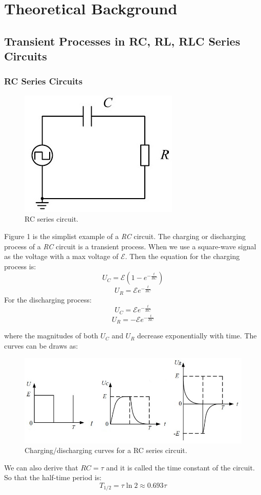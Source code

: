 \documentclass[12pt, a4paper]{article}
\begin{document}
\section{Theoretical Background}
\subsection{Transient Processes in RC, RL, RLC Series Circuits}
\subsubsection{RC Series Circuits}
\begin{figure}[H]
	\centering
	\includegraphics[scale=0.6]{fig1.jpg}
	\caption{RC series circuit.}
\end{figure}
Figure 1 is the simplist example of a \textit{RC} circuit. The charging or discharging process of a \textit{RC} 
circuit is a transient process. When we use a square-wave signal as the voltage with a max voltage of $\mathcal{E}$.
Then the equation for the charging process is:
$$U_C=\mathcal{E}(1-e^{-\frac{t}{RC}})$$
$$U_R=\mathcal{E}e^{-\frac{t}{RC}} $$
For the discharging process:
$$ U_C=\mathcal{E}e^{-\frac{t}{RC}} $$
$$ U_R=-\mathcal{E}e^{-\frac{t}{RC}} $$

where the magnitudes of both $ U_C $ and $ U_R $ decrease exponentially with time. The curves can be draws as:
\begin{figure}[H]
	\centering
	\includegraphics[scale=0.6]{fig2.jpg}
	\caption{Charging/discharging curves for a RC series circuit.}
\end{figure}
We can also derive that $RC = \tau$ and it is called the time constant of the circuit. 
So that the half-time period is:
$$ T_{1/2} = \tau\ln2\approx0.693\tau $$
\end{document}
